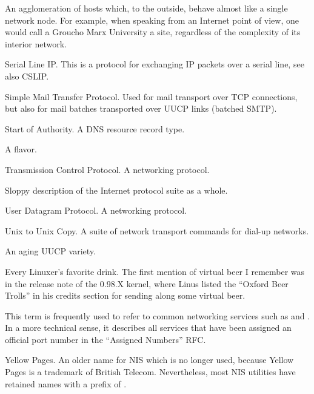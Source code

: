 \documentclass[11pt,makeidx]{report}
\begin{document}
{\begin{dispitems}
\ditem[site]
	An agglomeration of hosts which, to the outside, behave almost
	like a single network node. For example, when speaking from an
	Internet point of view, one would call a Groucho Marx University
	a site, regardless of the complexity of its interior network.

\ditem[SLIP]
	Serial Line IP. This is a protocol for exchanging IP packets over
	a serial line, see also CSLIP.

\ditem[SMTP]
        Simple Mail Transfer Protocol. Used for mail transport
        over TCP connections, but also for mail batches transported
        over UUCP links (batched SMTP).

\ditem[SOA]
        Start of Authority. A DNS resource record type.

\ditem[System V]
	A \unix{} flavor.

\ditem[TCP]
        Transmission Control Protocol. A networking protocol.

\ditem[TCP/IP]
        Sloppy description of the Internet protocol suite
        as a whole.

\ditem[UDP]
        User Datagram Protocol. A networking protocol.

\ditem[UUCP]
        Unix to Unix Copy.
        A suite of network transport commands for dial-up
        networks.

	An aging UUCP variety.

	Every Linuxer's favorite drink. The first mention of virtual
	beer I remember was in the release note of the \linux{} 0.98.X kernel,
	where Linus listed the ``Oxford Beer Trolls'' in his credits section
	for sending along some virtual beer.

	This term is frequently used to refer to common networking
	services such as  and .  In a more
	technical sense, it describes all services that have been
	assigned an official port number in the ``Assigned Numbers''
	RFC.

\ditem[YP]
	Yellow Pages. An older name for NIS which is no longer used,
	because Yellow Pages is a trademark of British Telecom.
	Nevertheless, most NIS utilities have retained names with
	a prefix of .

\end{dispitems}
}

\end{document}
